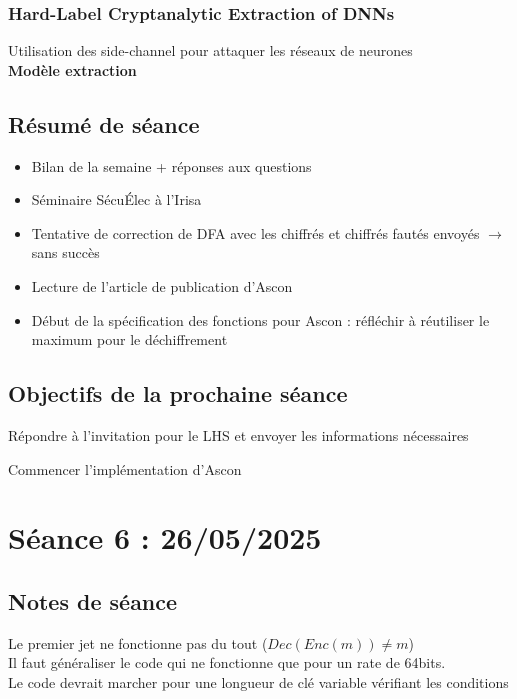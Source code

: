 \documentclass[12pt]{article}
\newcommand{\cmark}{\ding{51}}%
\newcommand{\done}{\rlap{$\square$}{\raisebox{2pt}{\large\hspace{1pt}\cmark}}%
	\hspace{-2.5pt}}
\begin{document}
	\subsubsection{Hard-Label Cryptanalytic Extraction of DNNs}
	Utilisation des side-channel pour attaquer les réseaux de neurones\\
	\textbf{Modèle extraction} 	
	
	\subsection{Résumé de séance}
	\begin{itemize}
		\item Bilan de la semaine + réponses aux questions
		\item Séminaire Sécu\'Elec à l'Irisa
		\item Tentative de correction de DFA avec les chiffrés et chiffrés fautés envoyés $\rightarrow$ sans succès
		\item Lecture de l'article de publication d'Ascon
		\item Début de la spécification des fonctions pour Ascon : réfléchir à réutiliser le maximum pour le déchiffrement
	\end{itemize}
	
	\subsection{Objectifs de la prochaine séance}
	\begin{todolist}
		\item[\done] Répondre à l'invitation pour le LHS et envoyer les informations nécessaires
		\item[\done] Commencer l'implémentation d'Ascon
	\end{todolist}
	
	
	\section{Séance 6 : 26/05/2025}
	\subsection{Notes de séance}
	Le premier jet ne fonctionne pas du tout ($Dec(Enc(m)) \neq m$)\\
	Il faut généraliser le code qui ne fonctionne que pour un rate de 64bits.\\
	Le code devrait marcher pour une longueur de clé variable vérifiant les conditions
	
\end{document}
